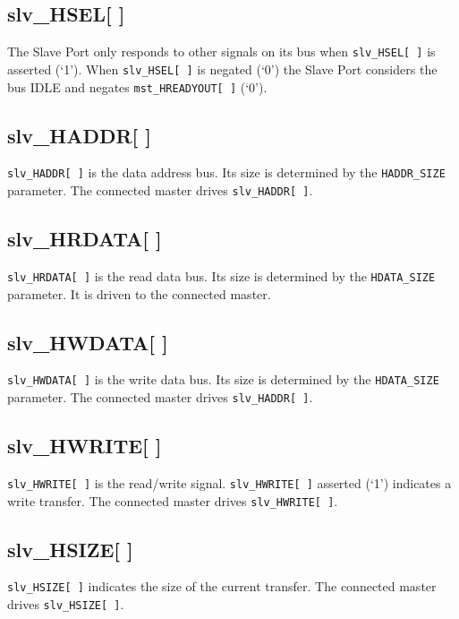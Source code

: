 \subsection{slv\_HSEL[ ]}\label{slv_hsel}

The Slave Port only responds to other signals on its bus when \texttt{slv\_HSEL[\,]} is
asserted (`1'). When \texttt{slv\_HSEL[\,]} is negated (`0') the Slave Port
considers the bus IDLE and negates \texttt{mst\_HREADYOUT[\,]} (`0').

\subsection{slv\_HADDR[ ]}\label{slv_haddr}

\texttt{slv\_HADDR[\,]} is the data address bus. Its size is determined by the
\texttt{HADDR\_SIZE} parameter. The connected master drives \texttt{slv\_HADDR[\,]}.

\subsection{slv\_HRDATA[ ]}\label{slv_hrdata}

\texttt{slv\_HRDATA[ ]} is the read data bus. Its size is determined by the
\texttt{HDATA\_SIZE} parameter. It is driven to the connected master.

\subsection{slv\_HWDATA[ ]}\label{slv_hwdata}

\texttt{slv\_HWDATA[\,]} is the write data bus. Its size is determined by the
\texttt{HDATA\_SIZE} parameter. The connected master drives \texttt{slv\_HADDR[\,]}.

\subsection{slv\_HWRITE[ ]}\label{slv_hwrite}

\texttt{slv\_HWRITE[\,]} is the read/write signal. \texttt{slv\_HWRITE[\,]} asserted (`1') indicates a
write transfer. The connected master drives \texttt{slv\_HWRITE[\,]}.

\subsection{slv\_HSIZE[ ]}\label{slv_hsize}

\texttt{slv\_HSIZE[\,]} indicates the size of the current transfer. The connected
master drives \texttt{slv\_HSIZE[\,]}.

